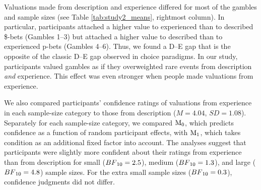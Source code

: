 \documentclass[a4paper, man, floatsintext]{apa6}
\begin{document}
Valuations made from description and experience differed for most of the
gambles and sample sizes (see Table \ref{tab:study2_means}, rightmost
column). In particular, participants attached a higher value to
experienced than to described \$-bets (Gambles 1--3) but attached a
higher value to described than to experienced p-bets (Gambles 4--6).
Thus, we found a D--E gap that is the opposite of the classic D--E gap
observed in choice paradigms. In our study, participants valued gambles
as if they overweighted rare events from description \textit{and}
experience. This effect was even stronger when people made valuations
from experience.

We also compared participants' confidence ratings of valuations from
experience in each sample-size category to those from description
(\(M = 4.04\), \(SD = 1.08\)). Separately for each sample-size category,
we compared \(\mathrm{M}\textsubscript{0}\), which predicts confidence
as a function of random participant effects, with
\(\mathrm{M}\textsubscript{1}\), which takes condition as an additional
fixed factor into account. The analyses suggest that participants were
slightly more confident about their ratings from experience than from
description for small (\(BF\textsubscript{10} = 2.5\)), medium
(\(BF\textsubscript{10} = 1.3\)), and large
(\(BF\textsubscript{10} = 4.8\)) sample sizes. For the extra small
sample sizes (\(BF\textsubscript{10} = 0.3\)), confidence judgments did
not differ.
\end{document}
